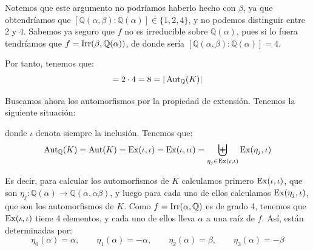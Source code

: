 \begin{ejemplo}
\begin{itemize}
        Notemos que este argumento no podríamos haberlo hecho con $\beta$, ya que obtendríamos que $[\mathbb{Q}(\alpha,\beta):\mathbb{Q}(\alpha)] \in \{1,2,4\}$, y no podemos distinguir entre $2$ y $4$. Sabemos ya seguro que $f$ no es irreducible sobre $\mathbb{Q}(\alpha)$, pues si lo fuera tendríamos que $f=\operatorname{Irr}(\beta,\mathbb{Q}(\alpha))$, de donde sería $[\mathbb{Q}(\alpha,\beta):\mathbb{Q}(\alpha)] = 4$.
    \end{itemize}

    Por tanto, tenemos que:
    \begin{equation*}
        [K:\mathbb{Q}] = 2\cdot 4 = 8 = |\Aut_\mathbb{Q}(K)|
    \end{equation*}
    

    Buscamos ahora los automorfismos por la propiedad de extensión. Tenemos la siguiente situación:
    \begin{center}
    \end{center}
    donde $\iota$ denota siempre la inclusión. Tenemos que:
    \begin{equation*}
        \operatorname{Aut}_\mathbb{Q}(K) = \operatorname{Aut}(K) = \operatorname{Ex}(\iota,\iota) = \operatorname{Ex}(\iota,\iota\iota) = \biguplus_{\eta_j\in \operatorname{Ex}(\iota,\iota)} \operatorname{Ex}(\eta_j,\iota)
    \end{equation*}

    Es decir, para calcular los automorfismos de $K$ calculamos primero $\operatorname{Ex}(\iota,\iota)$, que son $\eta_j:\mathbb{Q}(\alpha)\to \mathbb{Q}(\alpha,\alpha\beta)$, y luego para cada uno de ellos calculamos $\operatorname{Ex}(\eta_j,\iota)$, que son los automorfismos de $K$. Como $f=\operatorname{Irr}(\alpha,\mathbb{Q})$ es de grado 4, tenemos que $\operatorname{Ex}(\iota,\iota)$ tiene 4 elementos, y cada uno de ellos lleva $\alpha$ a una raíz de $f$. Así, están determinadas por:
    \begin{equation*}
        \eta_0(\alpha) = \alpha, \qquad \eta_1(\alpha) = -\alpha, \qquad \eta_2(\alpha) = \beta,\qquad \eta_3(\alpha) = -\beta
    \end{equation*}


\end{ejemplo}
